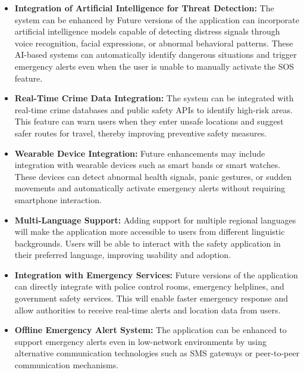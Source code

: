 \documentclass[a4paper,12pt]{report}
\begin{document}
\begin{itemize}

\item \textbf{Integration of Artificial Intelligence for Threat Detection:}  
The system can be enhanced by Future versions of the application can incorporate artificial intelligence models capable of detecting distress signals through voice recognition, facial expressions, or abnormal behavioral patterns. These AI-based systems can automatically identify dangerous situations and trigger emergency alerts even when the user is unable to manually activate the SOS feature.

\item \textbf{Real-Time Crime Data Integration:}  
The system can be integrated with real-time crime databases and public safety APIs to identify high-risk areas. This feature can warn users when they enter unsafe locations and suggest safer routes for travel, thereby improving preventive safety measures.

\item \textbf{Wearable Device Integration:}  
Future enhancements may include integration with wearable devices such as smart bands or smart watches. These devices can detect abnormal health signals, panic gestures, or sudden movements and automatically activate emergency alerts without requiring smartphone interaction.

\item \textbf{Multi-Language Support:}  
Adding support for multiple regional languages will make the application more accessible to users from different linguistic backgrounds. Users will be able to interact with the safety application in their preferred language, improving usability and adoption.

\item \textbf{Integration with Emergency Services:}  
Future versions of the application can directly integrate with police control rooms, emergency helplines, and government safety services. This will enable faster emergency response and allow authorities to receive real-time alerts and location data from users.

\item \textbf{Offline Emergency Alert System:}  
The application can be enhanced to support emergency alerts even in low-network environments by using alternative communication technologies such as SMS gateways or peer-to-peer communication mechanisms.

\end{itemize}
\end{document}
